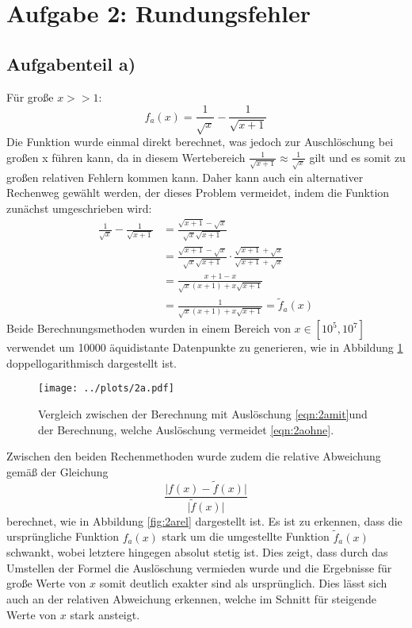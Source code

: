 \section*{Aufgabe 2: Rundungsfehler}
\subsection*{Aufgabenteil a)}
Für große $x>>1$:
\begin{equation}
  f_a(x)=\frac{1}{\sqrt{x}}-\frac{1}{\sqrt{x+1}}
  \label{eqn:2amit}
\end{equation}
Die Funktion wurde einmal direkt berechnet, was jedoch zur Auschlöschung bei großen x führen kann, da in diesem Wertebereich $\frac{1}{\sqrt{x+1}}\approx \frac{1}{\sqrt{x}}$ gilt und es somit zu großen relativen Fehlern kommen kann. Daher kann auch ein alternativer Rechenweg gewählt werden, der dieses Problem vermeidet, indem die Funktion zunächst umgeschrieben wird:
\begin{align}
  \frac{1}{\sqrt{x}}-\frac{1}{\sqrt{x+1}}&=\frac{\sqrt{x+1}-\sqrt{x}}{\sqrt{x}\sqrt{x+1}} \\
  &=\frac{\sqrt{x+1}-\sqrt{x}}{\sqrt{x}\sqrt{x+1}}\cdot\frac{\sqrt{x+1}+\sqrt{x}}{\sqrt{x+1}+\sqrt{x}}\\
  &=\frac{x+1-x}{\sqrt{x}(x+1)+x\sqrt{x+1}}\\
  &=\frac{1}{\sqrt{x}(x+1)+x\sqrt{x+1}}=\tilde{f}_a(x)
  \label{eqn:2aohne}
\end{align}
Beide Berechnungsmethoden wurden in einem Bereich von $x\in[10^5,10^7]$ verwendet um 10000 äquidistante
Datenpunkte zu generieren, wie in Abbildung \ref{fig:2a} doppellogarithmisch dargestellt ist.

\begin{figure}[H]
  \centering
  \texttt{[image: ../plots/2a.pdf]}
  \caption{Vergleich zwischen der Berechnung mit Auslöschung \eqref{eqn:2amit}und der Berechnung, welche Auslöschung vermeidet \eqref{eqn:2aohne}.}
  \label{fig:2a}
\end{figure}

Zwischen den beiden Rechenmethoden wurde zudem die relative Abweichung gemäß der Gleichung
\begin{equation}
  \frac{\lvert f(x)-\tilde{f}(x)\rvert}{\lvert \tilde{f}(x) \rvert}
  \label{eqn:abw}
\end{equation}
berechnet, wie in Abbildung \ref{fig:2arel} dargestellt ist. Es ist zu erkennen, dass die ursprüngliche Funktion $f_a(x)$ stark um die umgestellte Funktion $\tilde{f}_a(x)$ schwankt, wobei letztere hingegen absolut stetig ist. Dies zeigt, dass durch das Umstellen der Formel die Auslöschung vermieden wurde und die Ergebnisse für große Werte von $x$ somit deutlich exakter sind als ursprünglich. Dies lässt sich auch an der relativen Abweichung erkennen, welche im Schnitt für steigende Werte von $x$ stark ansteigt.

